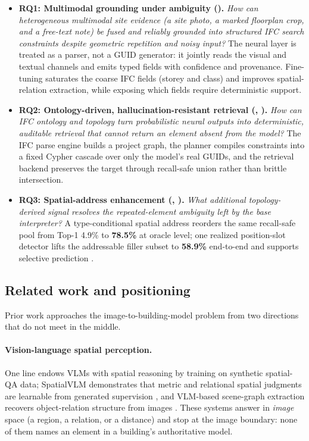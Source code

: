 \begin{itemize}
  \item \textbf{RQ1: Multimodal grounding under ambiguity ().}
  \emph{How can heterogeneous multimodal site evidence (a site photo, a marked floorplan crop, and a
  free-text note) be fused and reliably grounded into structured IFC search constraints despite
  geometric repetition and noisy input?} The neural layer is treated as a parser, not a GUID
  generator: it jointly reads the visual and textual channels and emits typed fields with confidence
  and provenance. Fine-tuning saturates the coarse IFC fields (storey and class) and improves
  spatial-relation extraction, while exposing which fields require deterministic support.

  \item \textbf{RQ2: Ontology-driven, hallucination-resistant retrieval (,
  ).}
  \emph{How can IFC ontology and topology turn probabilistic neural outputs into deterministic,
  auditable retrieval that cannot return an element absent from the model?} The IFC parse engine
  builds a project graph, the planner compiles constraints into a fixed Cypher cascade over only the
  model's real GUIDs, and the retrieval backend preserves the target through recall-safe union rather
  than brittle intersection.

  \item \textbf{RQ3: Spatial-address enhancement (,
  ).} \emph{What additional topology-derived signal resolves the repeated-element
  ambiguity left by the base interpreter?} A type-conditional spatial address reorders the same
  recall-safe pool from Top-1 4.9\% to \textbf{78.5\%} at oracle level; one realized position-slot
  detector lifts the addressable filler subset to \textbf{58.9\%} end-to-end and supports selective
  prediction \citep{guo2017calibration, geifman2017selective}.
\end{itemize}

\subsection{Related work and positioning}
\label{sec:related}

Prior work approaches the image-to-building-model problem from two directions that do not meet in
the middle.

\paragraph{Vision-language spatial perception.} One line endows VLMs with spatial reasoning by
training on synthetic spatial-QA data; SpatialVLM demonstrates that metric and relational spatial
judgments are learnable from generated supervision \citep{chen2024spatialvlm}, and VLM-based
scene-graph extraction recovers object-relation structure from images
\citep{wang2024vlmscenegraph}.
These systems answer in \emph{image} space (a region, a relation, or a distance) and stop at the
image boundary: none of them names an element in a building's authoritative model.

